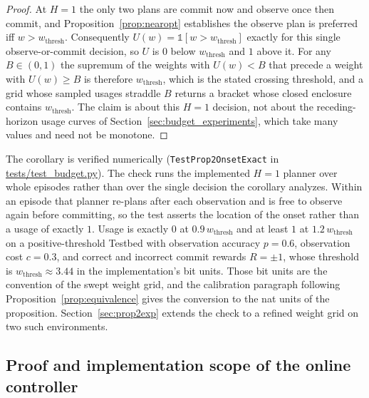 \begin{proof}
At $H{=}1$ the only two plans are commit now and observe once then commit, and Proposition~\ref{prop:nearopt} establishes the observe plan is preferred iff $w > w_{\mathrm{thresh}}$. Consequently $U(w) = \mathbb{1}[w > w_{\mathrm{thresh}}]$ exactly for this single observe-or-commit decision, so $U$ is $0$ below $w_{\mathrm{thresh}}$ and $1$ above it. For any $B \in (0,1)$ the supremum of the weights with $U(w) < B$ that precede a weight with $U(w) \ge B$ is therefore $w_{\mathrm{thresh}}$, which is the stated crossing threshold, and a grid whose sampled usages straddle $B$ returns a bracket whose closed enclosure contains $w_{\mathrm{thresh}}$. The claim is about this $H{=}1$ decision, not about the receding-horizon usage curves of Section~\ref{sec:budget_experiments}, which take many values and need not be monotone.
\end{proof}

The corollary is verified numerically (\texttt{TestProp2OnsetExact} in \url{tests/test_budget.py}). The check runs the implemented $H{=}1$ planner over whole episodes rather than over the single decision the corollary analyzes. Within an episode that planner re-plans after each observation and is free to observe again before committing, so the test asserts the location of the onset rather than a usage of exactly $1$. Usage is exactly $0$ at $0.9\,w_{\mathrm{thresh}}$ and at least $1$ at $1.2\,w_{\mathrm{thresh}}$ on a positive-threshold Testbed with observation accuracy $p{=}0.6$, observation cost $c{=}0.3$, and correct and incorrect commit rewards $R{=}\pm 1$, whose threshold is $w_{\mathrm{thresh}} \approx 3.44$ in the implementation's bit units. Those bit units are the convention of the swept weight grid, and the calibration paragraph following Proposition~\ref{prop:equivalence} gives the conversion to the nat units of the proposition. Section~\ref{sec:prop2exp} extends the check to a refined weight grid on two such environments.

\subsection{Proof and implementation scope of the online controller}
\label{app:theory_controller}

